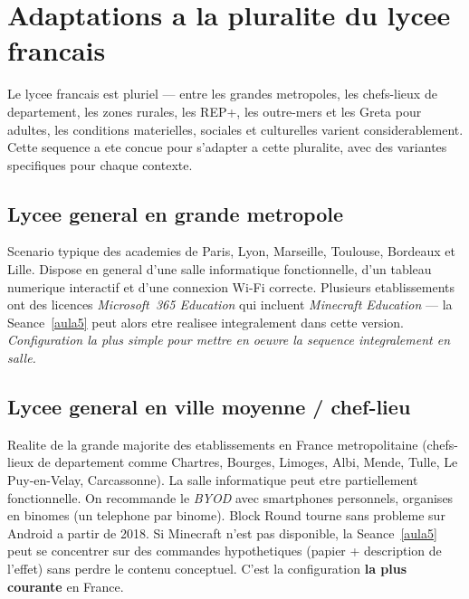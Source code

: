 \documentclass[12pt,a4paper]{scrartcl}
\newcommand{\acc}[1]{\textcolor{accent}{\textbf{#1}}}
\begin{document}
\section{Adaptations a la pluralite du lycee francais}\label{sec:adapt}

Le lycee francais est pluriel --- entre les grandes metropoles, les chefs-lieux de departement, les zones rurales, les REP+, les outre-mers et les Greta pour adultes, les conditions materielles, sociales et culturelles varient considerablement. Cette sequence a ete concue pour s'adapter a cette pluralite, avec des variantes specifiques pour chaque contexte.

\subsection{Lycee general en grande metropole}
Scenario typique des academies de Paris, Lyon, Marseille, Toulouse, Bordeaux et Lille. Dispose en general d'une salle informatique fonctionnelle, d'un tableau numerique interactif et d'une connexion Wi-Fi correcte. Plusieurs etablissements ont des licences \emph{Microsoft~365 Education} qui incluent \emph{Minecraft Education} --- la Seance~\ref{aula5} peut alors etre realisee integralement dans cette version. \emph{Configuration la plus simple pour mettre en oeuvre la sequence integralement en salle.}

\subsection{Lycee general en ville moyenne / chef-lieu}
Realite de la grande majorite des etablissements en France metropolitaine (chefs-lieux de departement comme Chartres, Bourges, Limoges, Albi, Mende, Tulle, Le Puy-en-Velay, Carcassonne). La salle informatique peut etre partiellement fonctionnelle. On recommande le \emph{BYOD} avec smartphones personnels, organises en binomes (un telephone par binome). Block Round tourne sans probleme sur Android a partir de 2018. Si Minecraft n'est pas disponible, la Seance~\ref{aula5} peut se concentrer sur des commandes hypothetiques (papier + description de l'effet) sans perdre le contenu conceptuel. C'est la configuration \acc{la plus courante} en France.
\end{document}
